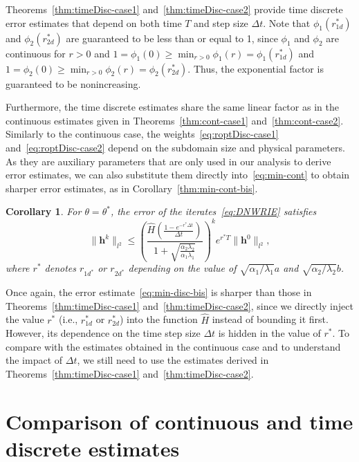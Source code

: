\documentclass[reqno]{amsart}
\newtheorem{corollary}{Corollary}
\begin{document}
Theorems~\ref{thm:timeDisc-case1} and~\ref{thm:timeDisc-case2} provide time discrete error estimates that depend on both time $T$ and step size $\Delta t$. Note that $\phi_1(r^*_{1d})$ and $\phi_2(r^*_{2d})$ are guaranteed to be less than or equal to 1, since $\phi_1$ and $\phi_2$ are continuous for $r>0$ and $1 =\phi_1(0) \geq \min_{r>0} \phi_1(r) = \phi_1(r^*_{1d})$ and $1 =\phi_2(0) \geq \min_{r>0} \phi_2(r) = \phi_2(r^*_{2d})$. Thus, the exponential factor is guaranteed to be nonincreasing. 

Furthermore, the time discrete estimates share the same linear factor as in the continuous estimates given in Theorems~\ref{thm:cont-case1} and~\ref{thm:cont-case2}. Similarly to the continuous case, the weights~\eqref{eq:roptDisc-case1} and~\eqref{eq:roptDisc-case2} depend on the subdomain size and physical parameters. As they are auxiliary parameters that are only used in our analysis to derive error estimates, we can also substitute them directly into~\eqref{eq:min-cont} to obtain sharper error estimates, as in Corollary~\ref{thm:min-cont-bis}.


\begin{corollary}\label{thm:min-disc-bis}
	For $\theta = \theta^*$, the error of the iterates~\eqref{eq:DNWRIE} satisfies
	\begin{equation}\label{eq:min-disc-bis}
			\|\boldsymbol h^k\|_{l^2} 
			\leq \left(\frac{\hat H \left(\frac{1-e^{-r^* \Delta t}}{\Delta t}\right)}{1+\sqrt{\frac{\alpha_2\lambda_2}{\alpha_1\lambda_1}}}\right)^ke^{r^*T} \|\boldsymbol{h}^0\|_{l^2},
	\end{equation} 
	where $r^*$ denotes $r_{1d^*}$ or $r_{2d^*}$ depending on the value of  $\sqrt{\alpha_1/\lambda_1} a$ and $\sqrt{\alpha_2/\lambda_2} b$.
\end{corollary}


Once again, the error estimate~\eqref{eq:min-disc-bis} is sharper than those in Theorems~\ref{thm:timeDisc-case1} and~\ref{thm:timeDisc-case2}, since we directly inject the value $r^*$ (i.e., $r_{1d}^*$ or $r_{2d}^*$) into the function $\hat H$ instead of bounding it first. However, its dependence on the time step size $\Delta t$ is hidden in the value of $r^*$. To compare with the estimates obtained in the continuous case and to understand the impact of $\Delta t$, we still need to use the estimates derived in Theorems~\ref{thm:timeDisc-case1} and~\ref{thm:timeDisc-case2}.
\section{Comparison of continuous and time discrete estimates}\label{sec:4}
\end{document}
